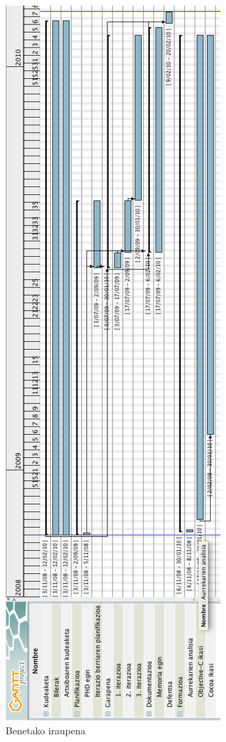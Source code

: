 \begin{figure}[htp]
\begin{center}
\includegraphics[scale=0.47]{Pictures/Chapter4/Ondorioak/iraupena.png}
\caption{Benetako iraupena}
\label{benetako-gantt}
\end{center}
\end{figure}
